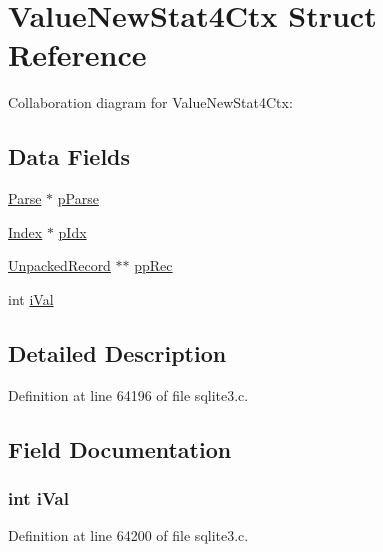 \hypertarget{struct_value_new_stat4_ctx}{}\section{Value\+New\+Stat4\+Ctx Struct Reference}
\label{struct_value_new_stat4_ctx}


Collaboration diagram for Value\+New\+Stat4\+Ctx\+:
\subsection*{Data Fields}
\begin{DoxyCompactItemize}
\item 
\hyperlink{struct_parse}{Parse} $\ast$ \hyperlink{struct_value_new_stat4_ctx_ac700bf257b32cd7e491fde90a081379d}{p\+Parse}
\item 
\hyperlink{struct_index}{Index} $\ast$ \hyperlink{struct_value_new_stat4_ctx_a0a616595a4d7fb288679febde269dd1e}{p\+Idx}
\item 
\hyperlink{struct_unpacked_record}{Unpacked\+Record} $\ast$$\ast$ \hyperlink{struct_value_new_stat4_ctx_a938bf6e932b7a4329fedc87206d3efe5}{pp\+Rec}
\item 
int \hyperlink{struct_value_new_stat4_ctx_a9ffedc9686e7cd04fd8b0d4c0b84c038}{i\+Val}
\end{DoxyCompactItemize}


\subsection{Detailed Description}


Definition at line 64196 of file sqlite3.\+c.



\subsection{Field Documentation}
\hypertarget{struct_value_new_stat4_ctx_a9ffedc9686e7cd04fd8b0d4c0b84c038}{}
\subsubsection[{i\+Val}]{\setlength{\rightskip}{0pt plus 5cm}int i\+Val}\label{struct_value_new_stat4_ctx_a9ffedc9686e7cd04fd8b0d4c0b84c038}


Definition at line 64200 of file sqlite3.\+c.

